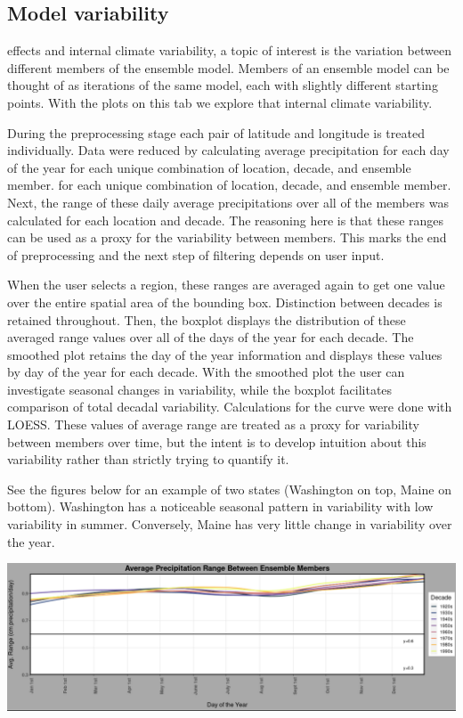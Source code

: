 \documentclass[10pt,letterpaper]{article}
\begin{document}
\subsection*{Model variability}

effects and internal climate variability, a topic of interest is the variation between different members of the ensemble model. Members of an ensemble model can be thought of as iterations of the same model, each with slightly different starting points. With the plots on this tab we explore that internal climate variability.

During the preprocessing stage each pair of latitude and longitude is treated individually. Data were reduced by calculating average precipitation for each day of the year for each unique combination of location, decade, and ensemble member. for each unique combination of location, decade, and ensemble member. Next, the range of these daily average precipitations over all of the members was calculated for each location and decade. The reasoning here is that these ranges can be used as a proxy for the variability between members. This marks the end of preprocessing and the next step of filtering depends on user input.

When the user selects a region, these ranges are averaged again to get one value over the entire spatial area of the bounding box. Distinction between decades is retained throughout. Then, the boxplot displays the distribution of these averaged range values over all of the days of the year for each decade. The smoothed plot retains the day of the year information and displays these values by day of the year for each decade. With the smoothed plot the user can investigate seasonal changes in variability, while the boxplot facilitates comparison of total decadal variability. Calculations for the curve were done with LOESS\cite{cleveland1988locally}. These values of average range are treated as a proxy for variability between members over time, but the intent is to develop intuition about this variability rather than strictly trying to quantify it.


See the figures below for an example of two states (Washington on top, Maine on bottom). Washington has a noticeable seasonal pattern in variability with low variability in summer. Conversely, Maine has very little change in variability over the year.

\begin{center}
  \includegraphics[width = .9\textwidth]{graphics/ensemble_members_bottom_figure.png}
\end{center}
\end{document}
